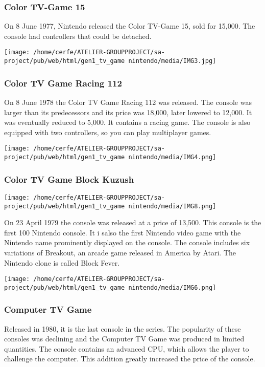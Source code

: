 \documentclass[a4paper,10pt]{book}
\begin{document}
 
 \subsubsection{Color TV-Game 15 }
 
  On 8 June 1977, Nintendo released the Color TV-Game 15, sold for 15,000. The console had controllers that could be detached.
 
 \texttt{[image: /home/cerfe/ATELIER-GROUPPROJECT/sa-project/pub/web/html/gen1\_tv\_game nintendo/media/IMG3.jpg]}
 
 
 \subsubsection{Color TV Game Racing 112 }
 
  On 8 June 1978 the Color TV Game Racing 112 was released. The console was larger than its predecessors and its price was 18,000, later lowered to 12,000. It was eventually reduced to 5,000. It contains a racing game. The console is also equipped with two controllers, so you can play multiplayer games.
 
 \texttt{[image: /home/cerfe/ATELIER-GROUPPROJECT/sa-project/pub/web/html/gen1\_tv\_game nintendo/media/IMG4.png]}
 
 
 \subsubsection{Color TV Game Block Kuzush }
 
 
 \texttt{[image: /home/cerfe/ATELIER-GROUPPROJECT/sa-project/pub/web/html/gen1\_tv\_game nintendo/media/IMG8.png]}
 
 On 23 April 1979 the console was released at a price of  13,500. This console is the first 100 Nintendo console. It i salso the first Nintendo video game with the Nintendo name prominently displayed on the console. The console includes six variations of Breakout, an arcade game released in America by Atari. The Nintendo clone is called Block Fever.
 
 
 \texttt{[image: /home/cerfe/ATELIER-GROUPPROJECT/sa-project/pub/web/html/gen1\_tv\_game nintendo/media/IMG6.png]}
 
 
 \subsubsection{Computer TV Game }
 
  Released in 1980, it is the last console in the series. The popularity of these consoles was declining and the Computer TV Game was produced in limited quantities. The console contains an advanced CPU, which allows the player to challenge the computer. This addition greatly increased the price of the console.
 
\end{document}
